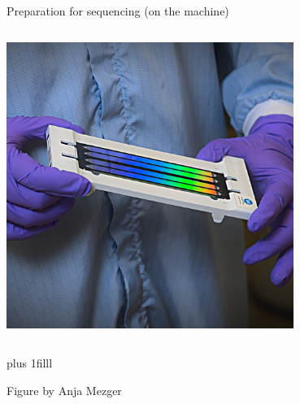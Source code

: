 \documentclass[10pt]{beamer}
\newcommand{\creditdarkleft}[1]{{\vskip0pt plus 1filll \par \raggedright \scriptsize \mdseries \color{scMGray} #1 \par}}
\begin{document}
\begin{frame}[standout]{Preparation for sequencing (on the machine)}
\begin{columns}[T,onlytextwidth]
		\hspace{2em}\includegraphics[width=0.7\textwidth]{./figures/flow_cell_3b.jpg}
	\end{columns}
\creditdarkleft{Figure by Anja Mezger}
\end{frame}
\end{document}
